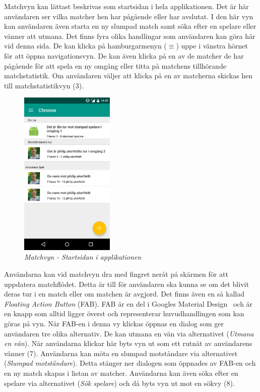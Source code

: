 \documentclass[a4paper, 11pt]{article}
\begin{document}
Matchvyn kan lättast beskrivas som startsidan i hela applikationen. Det är här användaren ser vilka matcher hen har pågående eller har avslutat. I den här vyn kan användaren även starta en ny slumpad match samt söka efter en spelare eller vänner att utmana. 
Det finns fyra olika handlingar som användaren kan göra här vid denna sida. De kan klicka på hamburgarmenyn ($\equiv$) uppe i vänstra hörnet för att öppna navigationsvyn. De kan även klicka på en av de matcher de har pågående för att spela en ny omgång eller titta på matchens tillhörande matchstatistik. Om användaren väljer att klicka på en av matcherna skickas hen till matchstatistikvyn (3).
\begin{figure}[H]
\begin{center}
	\includegraphics[width=0.4\textwidth]{app_matches} 
	\caption{\textit{Matchvyn - Startsidan i applikationen}}
	\end{center}
\end{figure}
\pagebreak

Användarna kan vid matchvyn dra med fingret neråt på skärmen för att uppdatera matchflödet. Detta är till för användaren ska kunna se om det blivit deras tur i en match eller om matchen är avgjord. Det finns även en så kallad \textit{Floating Action Button} (FAB). FAB är en del i Googles Material Design~\cite{MaterialDesign} och är en knapp som alltid ligger överst och representerar huvudhandlingen som kan göras på vyn. När FAB-en i denna vy klickas öppnas en dialog som ger användaren tre olika alternativ. De kan utmana en vän via alternativet (\textit{Utmana en vän}). När användarna klickar här byts vyn ut som ett rutnät av användarens vänner (7). 
Användarna kan möta en slumpad motståndare via alternativet (\textit{Slumpad motståndare}). Detta stänger ner dialogen som öppnades av FAB-en och en ny match skapas i listan av matcher. Användarna kan även söka efter en spelare via alternativet (\textit{Sök spelare}) och då byts vyn ut mot en sökvy (8). 
\end{document}
